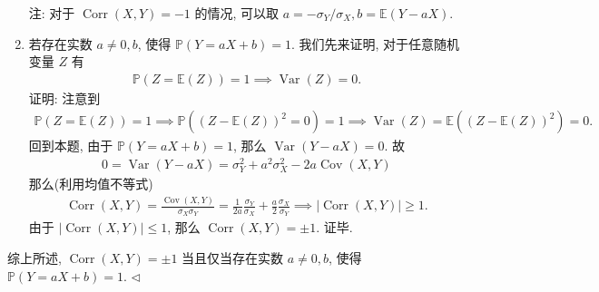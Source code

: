 \documentclass[11pt]{article}
\newenvironment{answer}[1][Solution]{\begin{trivlist}
    \item[\hskip \labelsep {\bfseries #1.}\hskip \labelsep]}{\hfill$\lhd$\end{trivlist}}
\newcommand\1{\mathds{1}}
\newcommand\E{\mathbb{E}}
\newcommand\PP{\mathbb{P}}
\DeclareMathOperator{\Var}{Var}
\DeclareMathOperator{\Cov}{Cov}
\DeclareMathOperator{\Corr}{Corr}
\begin{document}
\begin{answer}
\begin{enumerate}[label=(\arabic*)]
        注: 对于 $\Corr(X,Y) = -1$ 的情况, 可以取 $a = -\sigma_Y/\sigma_X, b=\E(Y-aX)$.
        \item 若存在实数 $a\neq 0,b$, 使得 $\PP(Y=aX+b) = 1$. 我们先来证明, 对于任意随机变量 $Z$ 有
        \begin{align*}
            \PP(Z=\E(Z)) = 1 \implies \Var(Z) = 0.
        \end{align*}
        证明: 注意到 
        \begin{align*}
            \PP(Z=\E(Z)) = 1 \implies \PP((Z-\E(Z))^2 = 0) = 1 \implies \Var(Z) = \E((Z-\E(Z))^2) = 0.
        \end{align*}
        回到本题, 由于 $\PP(Y=aX+b) = 1$, 那么 $\Var(Y-aX) = 0$. 故
        \begin{align*}
            0 = \Var(Y-aX) = \sigma_Y^2 + a^2 \sigma_X^2 - 2a\Cov(X,Y)
        \end{align*}
        那么(利用均值不等式)
        \begin{align*}
            \Corr(X,Y) = \frac{\Cov(X,Y)}{\sigma_X \sigma_Y} = \frac{1}{2a} \frac{\sigma_Y}{\sigma_X} + \frac{a}{2} \frac{\sigma_X}{\sigma_Y} \implies |\Corr(X,Y)| \ge 1.
        \end{align*}
        由于 $|\Corr(X,Y)| \le 1$, 那么 $\Corr(X,Y) = \pm 1$. 证毕.
    \end{enumerate}
    综上所述, $\Corr(X,Y) = \pm 1$ 当且仅当存在实数 $a\neq 0,b$, 使得 $\PP(Y=aX+b) = 1$.
\end{answer}
\end{document}
